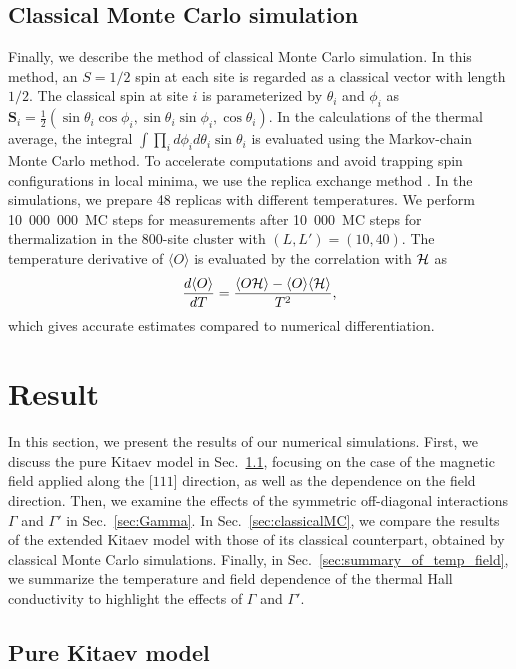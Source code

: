\documentclass[twocolumn,superscriptaddress,showpacs, longbibliography, aps, prx]{revtex4-2}
\begin{document}
\subsection{Classical Monte Carlo simulation}\label{subsec:Classical Monte Carlo simulation}
Finally, we describe the method of classical Monte Carlo simulation.
In this method, an $S=1/2$ spin at each site is regarded as a classical vector with length $1/2$.
The classical spin at site $i$ is parameterized by $\theta_i$ and $\phi_i$ as $\bm{S}_i = \frac{1}{2}(\sin\theta_i\cos\phi_i, \sin\theta_i\sin\phi_i, \cos\theta_i)$.
In the calculations of the thermal average, the integral $\int \prod_i d\phi_i d\theta_i \sin\theta_i$ is evaluated using the Markov-chain Monte Carlo method.
To accelerate computations and avoid trapping spin configurations in local minima, we use the replica exchange method \cite{Hukushima1996}.
In the simulations, we prepare 48 replicas with different temperatures.
We perform 10~000~000~MC steps for measurements after 10~000~MC steps for thermalization in the 800-site cluster with $(L, L') = (10, 40)$. 
The temperature derivative of $\langle O \rangle$ is evaluated by the correlation with ${\cal H}$ as  
\begin{align}
\frac{d\langle O \rangle}
{dT}=\frac{
\langle O 
{\cal H}\rangle -\langle O 
\rangle \langle {\cal H}\rangle} 
{T^2},  
\end{align}
which gives accurate estimates compared to numerical differentiation. 

\section{Result}\label{sec:Results}
In this section, we present the results of our numerical simulations. First, we discuss the pure Kitaev model in Sec.~\ref{sec:pureKitaev}, focusing on the case of the magnetic field applied along the [$111$] direction, as well as the dependence on the field direction. 
Then, we examine the effects of the symmetric off-diagonal interactions $\Gamma$ and $\Gamma'$ in Sec.~\ref{sec:Gamma}. In Sec.~\ref{sec:classicalMC}, we compare the results of the extended Kitaev model with those of its classical counterpart, obtained by classical Monte Carlo simulations. 
Finally, in Sec.~\ref{sec:summary_of_temp_field}, we summarize the temperature and field dependence of the thermal Hall conductivity to highlight the effects of $\Gamma$ and $\Gamma'$.

\subsection{Pure Kitaev model}
\label{sec:pureKitaev}
\end{document}
